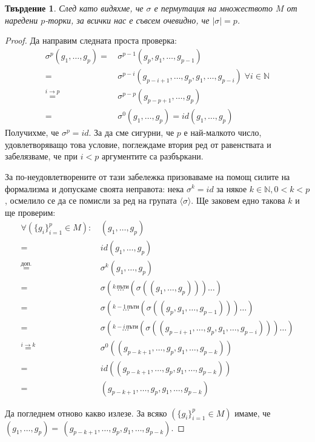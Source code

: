 \documentclass{article}
\newtheorem*{prop}{Твърдение}
\newcommand{\grsigma}[0]{{\langle \sigma \rangle}}
\begin{document}
\begin{prop}
    След като видяхме, че $\sigma$ е пермутация на множеството $M$ от наредени $p$-торки, за всички нас е съвсем очевидно, че $|\sigma| = p$.
\end{prop}
\begin{proof}
    Да направим следната проста проверка:
    \begin{align*}
        \sigma^p(g_1,\dots, g_p) =\,&\sigma^{p-1}(g_p, g_1,\dots, g_{p-1}) \\
        =\,&\sigma^{p-i}(g_{p-i+1},\dots,g_p,g_1,\dots,g_{p-i})\;\forall i\in\mathbb N\\
        \overset{i \rightarrow p}{=}\,&\sigma^{p-p}(g_{p-p+1},\dots,g_p)\\
        =\,&\sigma^{0}(g_{1},\dots,g_p) = id(g_{1},\dots,g_p)
    \end{align*}
    Получихме, че $\sigma^p = id$.
    За да сме сигурни, че $p$ е най-малкото число, удовлетворяващо това условие,
    поглеждаме втория ред от равенствата и забелязваме, че при $i<p$ аргументите са разбъркани.

    За по-неудовлетворените от тази забележка призоваваме на помощ силите на формализма и допускаме своята неправота: нека $\sigma^k = id$ за някое $k \in \mathbb N, 0 < k < p$, осмелило се да се помисли за ред на групата $\grsigma$.
    Ще заковем едно такова $k$ и ще проверим:
    \begin{align*}
        \forall (\{g_i\}_{i=1}^p \in M)\!:\, &(g_1,\dots, g_p) \\
        =\,&id(g_1,\dots, g_p) \\
        \overset{\textit{доп.}}{=}\,&\sigma^k(g_1, \dots, g_p)\\
        =\,&\sigma(\overset{k\,\text{пъти}}{\dots}   ( \sigma( (g_1,\dots, g_p)))\dots)\\
        =\,&\sigma(\overset{k-1\,\text{пъти}}{\dots} ( \sigma( (g_p, g_1,\dots, g_{p-1})))\dots)\\
        =\,&\sigma(\overset{k-i\,\text{пъти}}{\dots} ( \sigma( (g_{p-i+1}, \dots, g_p, g_1,\dots, g_{p-i})))\dots)\\
        \overset{i\rightarrow k}{=}\,&\sigma^0( (g_{p-k+1}, \dots, g_p, g_1,\dots, g_{p-k})) \\
        =\,&id( (g_{p-k+1}, \dots, g_p, g_1,\dots, g_{p-k}))\\
        =\,&(g_{p-k+1}, \dots, g_p, g_1,\dots, g_{p-k})
    \end{align*}

    Да погледнем отново какво излезе.
    За всяко $(\{g_i\}_{i=1}^p \in M)$ имаме, че $(g_1,\dots, g_p) =\,(g_{p-k+1}, \dots, g_p, g_1,\dots, g_{p-k})$.


\end{proof}
\end{document}
